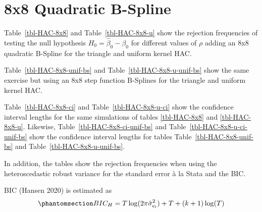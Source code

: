 \documentclass[
]{article}
\begin{document}
\section{8x8 Quadratic B-Spline}\label{sec-8x8}

Table~\ref{tbl-HAC-8x8} and Table~\ref{tbl-HAC-8x8-u} show the rejection
frequencies of testing the null hypothesis \(H_0=\hat\beta_0-\beta_0\)
for different values of \(\rho\) adding an 8x8 quadratic B-Spline for
the triangle and uniform kernel HAC.

Table~\ref{tbl-HAC-8x8-unif-bs} and Table~\ref{tbl-HAC-8x8-u-unif-bs}
show the same exercise but using an 8x8 step function B-Splines for the
triangle and uniform kernel HAC.

Table~\ref{tbl-HAC-8x8-ci} and Table~\ref{tbl-HAC-8x8-u-ci} show the
confidence interval lengths for the same simulations of tables
\ref{tbl-HAC-8x8} and \ref{tbl-HAC-8x8-u}. Likewise,
Table~\ref{tbl-HAC-8x8-ci-unif-bs} and
Table~\ref{tbl-HAC-8x8-u-ci-unif-bs} show the confidence interval
lengths for tables Table~\ref{tbl-HAC-8x8-unif-bs} and
Table~\ref{tbl-HAC-8x8-u-unif-bs}.

In addition, the tables show the rejection frequencies when using the
heteroscedastic robust variance for the standard error à la Stata and
the BIC.

BIC (Hansen 2020) is estimated as
\begin{equation}\phantomsection\label{eq-hansen-bic}{
BIC_H=T\log(2\pi\hat{\sigma}^2_{e_l})+T+(k+1)\log(T)
}\end{equation}
\end{document}
